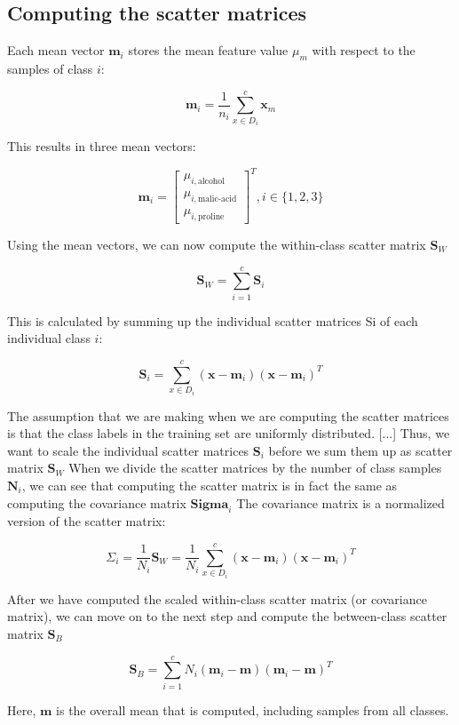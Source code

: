 \documentclass[letterpaper]{report}
\begin{document}
\subsection{Computing the scatter matrices}

Each mean vector $\mathbf{m}_i$ stores the mean feature value $\mu_m$ with respect to the samples of class $i$:

\[
\mathbf{m}_i = \frac{1}{n_i} \sum_{x \in D_i}^{c} \mathbf{x}_m
\]

This results in three mean vectors:

\[
\mathbf{m}_i = \begin{bmatrix} 
\mu_{i, \text{alcohol}} \\
\mu_{i, \text{malic-acid}} \\
\mu_{i, \text{proline}} 
 \end{bmatrix}^T, i  \in   \{ 1, 2, 3 \}
\]

Using the mean vectors, we can now compute the within-class scatter matrix $\mathbf{S}_W$

\[
\mathbf{S}_W = \sum^{c}_{i=1} \mathbf{S}_i
\]

This is calculated by summing up the individual scatter matrices Si of each
individual class $i$:

\[
\mathbf{S}_i = \sum_{x \in D_i}^{c} (\mathbf{x} - \mathbf{m}_i) (\mathbf{x} - \mathbf{m}_i)^T
\]

The assumption that we are making when we are computing the scatter matrices is that the class labels in the training set are uniformly distributed. [...] Thus, we want to scale the individual scatter matrices $\mathbf{S}_i$ before we sum them up as scatter matrix $\mathbf{S}_W$ When we divide the scatter matrices by the number of class samples $\mathbf{N}_i$, we can see that computing the scatter matrix is in fact the same as computing the covariance matrix $\mathbf{Sigma}_i$ The covariance matrix is a normalized version of the scatter matrix:

\[
\Sigma_i = \frac{1}{N_i} \mathbf{S}_W = \frac{1}{N_i} \sum^{c}_{x \in D_i}  (\mathbf{x} - \mathbf{m}_i) (\mathbf{x} - \mathbf{m}_i)^T
\]

After we have computed the scaled within-class scatter matrix (or covariance matrix), we can move on to the next step and compute the between-class scatter matrix $\mathbf{S}_B$

\[
\mathbf{S}_B = \sum^{c}_{i=1} N_i (\mathbf{m}_i - \mathbf{m})(\mathbf{m}_i - \mathbf{m})^T
\]

Here, $\mathbf{m}$ is the overall mean that is computed, including samples from all classes.
\end{document}
